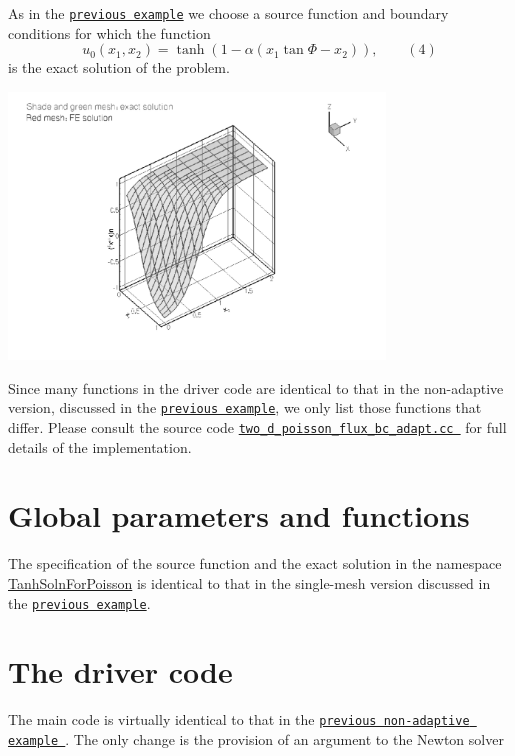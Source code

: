 As in the \href{../../two_d_poisson_flux_bc2/html/index.html}{\tt previous example} we choose a source function and boundary conditions for which the function \[ u_0(x_1,x_2) = \tanh(1-\alpha(x_1 \tan\Phi - x_2)), \ \ \ \ \ \ \ \ \ (4) \] is the exact solution of the problem.

 
\begin{DoxyImage}
\includegraphics[width=0.75\textwidth]{rotate}
\end{DoxyImage}


Since many functions in the driver code are identical to that in the non-\/adaptive version, discussed in the \href{../../two_d_poisson_flux_bc2/html/index.html}{\tt previous example}, we only list those functions that differ. Please consult the source code \href{../../../../demo_drivers/poisson/two_d_poisson_flux_bc_adapt/two_d_poisson_flux_bc_adapt.cc}{\tt two\+\_\+d\+\_\+poisson\+\_\+flux\+\_\+bc\+\_\+adapt.\+cc } for full details of the implementation.



 

\hypertarget{index_global}{}\section{Global parameters and functions}\label{index_global}
The specification of the source function and the exact solution in the namespace {\ttfamily \hyperlink{namespaceTanhSolnForPoisson}{Tanh\+Soln\+For\+Poisson}} is identical to that in the single-\/mesh version discussed in the \href{../../two_d_poisson_flux_bc/html/index.html}{\tt previous example}.



 

\hypertarget{index_main}{}\section{The driver code}\label{index_main}
The main code is virtually identical to that in the \href{../../two_d_poisson_flux_bc2/html/index.html}{\tt previous non-\/adaptive example }. The only change is the provision of an argument to the Newton solver

